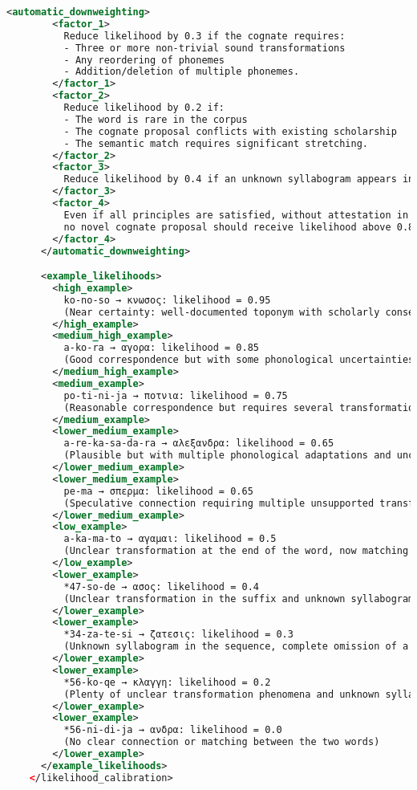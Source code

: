 \begin{lstlisting}[style=mystyle, language=XML, breaklines=true]
      <automatic_downweighting>
        <factor_1>
          Reduce likelihood by 0.3 if the cognate requires:
          - Three or more non-trivial sound transformations
          - Any reordering of phonemes
          - Addition/deletion of multiple phonemes.
        </factor_1>
        <factor_2>
          Reduce likelihood by 0.2 if:
          - The word is rare in the corpus
          - The cognate proposal conflicts with existing scholarship
          - The semantic match requires significant stretching.
        </factor_2>
        <factor_3>
          Reduce likelihood by 0.4 if an unknown syllabogram appears in the linear B sequence. The likelihood of sequences with unknown syllabograms MUST ALWAYS BE LESS THAN 0.7, THIS IS A HARD CAP, NON-NEGOTIABLE. All unknown syllabograms are those starting with '*' and ending in a number, like '*19' or '*22'.
        </factor_3>
        <factor_4>
          Even if all principles are satisfied, without attestation in scholarly literature,
          no novel cognate proposal should receive likelihood above 0.85.
        </factor_4>
      </automatic_downweighting>

      <example_likelihoods>
        <high_example>
          ko-no-so → κνωσος: likelihood = 0.95
          (Near certainty: well-documented toponym with scholarly consensus)
        </high_example>
        <medium_high_example>
          a-ko-ra → αγορα: likelihood = 0.85
          (Good correspondence but with some phonological uncertainties)
        </medium_high_example>
        <medium_example>
          po-ti-ni-ja → ποτνια: likelihood = 0.75
          (Reasonable correspondence but requires several transformations)
        </medium_example>
        <lower_medium_example>
          a-re-ka-sa-da-ra → αλεξανδρα: likelihood = 0.65
          (Plausible but with multiple phonological adaptations and uncertainties)
        </lower_medium_example>
        <lower_medium_example>
          pe-ma → σπερμα: likelihood = 0.65
          (Speculative connection requiring multiple unsupported transformations)
        </lower_medium_example>
        <low_example>
          a-ka-ma-to → αγαμαι: likelihood = 0.5
          (Unclear transformation at the end of the word, now matching suffixes but probably a similar root)
        </low_example>
        <lower_example>
          *47-so-de → ασος: likelihood = 0.4
          (Unclear transformation in the suffix and unknown syllabogram in the sequence)
        </lower_example>
        <lower_example>
          *34-za-te-si → ζατεσις: likelihood = 0.3
          (Unknown syllabogram in the sequence, complete omission of a syllabogram for no good reason)
        </lower_example>
        <lower_example>
          *56-ko-qe → κλαγγη: likelihood = 0.2
          (Plenty of unclear transformation phenomena and unknown syllabogram in the sequence)
        </lower_example>
        <lower_example>
          *56-ni-di-ja → ανδρα: likelihood = 0.0
          (No clear connection or matching between the two words)
        </lower_example>
      </example_likelihoods>
    </likelihood_calibration>


\end{lstlisting}
